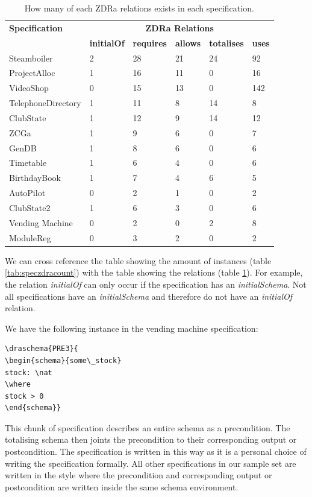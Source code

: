 \begin{table}[H]
\begin{tabular}{|l |l | l |l | l| l |}
\hline
\textbf{Specification} & \multicolumn{5}{c|}{\textbf{ZDRa Relations}}\\
\cline{2-6}
 & \textbf{initialOf} & \textbf{requires} & \textbf{allows} & \textbf{totalises}
 & \textbf{uses} \\
\hline
Steamboiler & 2 & 28 & 21 & 24 & 92  \\
ProjectAlloc & 1 & 16 & 11 & 0 & 16  \\
VideoShop  & 0 & 15 & 13 & 0 & 142  \\
TelephoneDirectory &  1 & 11 & 8 & 14 & 8 \\
ClubState &  1 & 12 & 9 & 14 & 12  \\
ZCGa & 1 & 9 & 6 & 0 & 7  \\
GenDB & 1 & 8 & 6 & 0 & 6  \\
Timetable & 1 & 6 & 4 & 0 & 6  \\
BirthdayBook & 1 & 7 & 4 & 6 & 5  \\
AutoPilot & 0 & 2 & 1 & 0 & 2 \\
ClubState2 & 1 & 6 & 3 & 0 & 6 \\
Vending Machine & 0 & 2 & 0 & 2 & 8  \\
ModuleReg & 0 & 3 & 2 & 0 & 2  \\
\hline
\end{tabular}
\caption{How many of each ZDRa relations exists in each specification. \label{tab:speczdrarelationscount}}
\end{table}

We can cross reference the table showing the amount of instances (table
\ref{tab:speczdracount}) with the table showing the relations (table
\ref{tab:speczdrarelationscount}). For example, the relation \emph{initialOf}
can only occur if the specification has an \emph{initialSchema}. Not all
specifications have an \emph{initialSchema} and therefore do not have an
\emph{initialOf} relation.

We have the following instance in the vending machine specification:

\begin{verbatim}
\draschema{PRE3}{
\begin{schema}{some\_stock}
stock: \nat
\where
stock > 0
\end{schema}}
\end{verbatim}

This chunk of specification describes an entire schema as a precondition. The
totalising schema then joints the precondition to their corresponding output or
postcondition. The specification is written in this way as it is a personal
choice of writing the specification formally. All other specifications in our
sample set are written in the style where the precondition and corresponding
output or postcondition are written inside the same schema environment.

